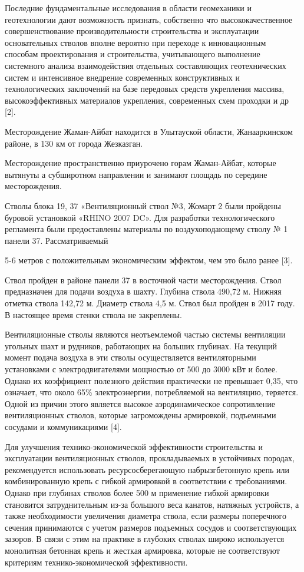 Последние фундаментальные исследования в области геомеханики и
геотехнологии дают возможность признать, собственно что
высококачественное совершенствование производительности строительства и
эксплуатации основательных стволов вполне вероятно при переходе к
инновационным способам проектирования и строительства, учитывающего
выполнение системного анализа взаимодействия отдельных составляющих
геотехнических систем и интенсивное внедрение современных конструктивных
и технологических заключений на базе передовых средств укрепления
массива, высокоэффективных материалов укрепления, современных схем
проходки и др {[}2{]}.

Месторождение Жаман-Айбат находится в Улытауской области, Жанааркинском
районе, в 130 км от города Жезказган.

Месторождение пространственно приурочено горам Жаман-Айбат, которые
вытянуты а субширотном направлении и занимают площадь по середине
месторождения.

Стволы блока 19, 37 «Вентиляционный ствол №3, Жомарт 2 были пройдены
буровой установкой «RHINO 2007 DC». Для разработки технологического
регламента были предоставлены материалы по воздухоподающему стволу № 1
панели 37. Рассматриваемый

5-6 метров с положительным экономическим эффектом, чем это было ранее
{[}3{]}.

Ствол пройден в районе панели 37 в восточной части месторождения. Ствол
предназначен для подачи воздуха в шахту. Глубина ствола 490,72 м. Нижняя
отметка ствола 142,72 м. Диаметр ствола 4,5 м. Ствол был пройден в 2017
году. В настоящее время стенки ствола не закреплены.

Вентиляционные стволы являются неотъемлемой частью системы вентиляции
угольных шахт и рудников, работающих на больших глубинах. На текущий
момент подача воздуха в эти стволы осуществляется вентиляторными
установками с электродвигателями мощностью от 500 до 3000 кВт и более.
Однако их коэффициент полезного действия практически не превышает 0,35,
что означает, что около 65\% электроэнергии, потребляемой на вентиляцию,
теряется. Одной из причин этого является высокое аэродинамическое
сопротивление вентиляционных стволов, которые загромождены армировкой,
подъемными сосудами и коммуникациями {[}4{]}.

Для улучшения технико-экономической эффективности строительства и
эксплуатации вентиляционных стволов, прокладываемых в устойчивых
породах, рекомендуется использовать ресурсосберегающую набрызгбетонную
крепь или комбинированную крепь с гибкой армировкой в соответствии с
требованиями. Однако при глубинах стволов более 500 м применение гибкой
армировки становится затруднительным из-за большого веса канатов,
натяжных устройств, а также необходимости увеличения диаметра ствола,
если размеры поперечного сечения принимаются с учетом размеров подъемных
сосудов и соответствующих зазоров. В связи с этим на практике в глубоких
стволах широко используется монолитная бетонная крепь и жесткая
армировка, которые не соответствуют критериям технико-экономической
эффективности.

